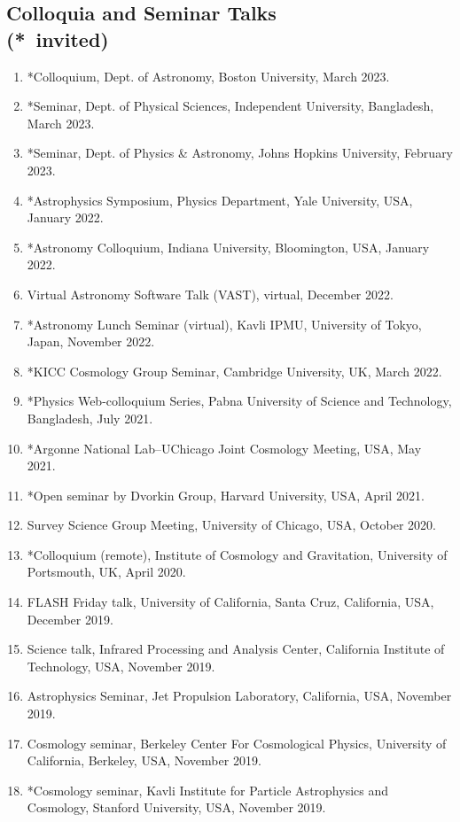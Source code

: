 \documentclass[margin, line]{res}
\begin{document}
\begin{resume}
\section{\sc Colloquia and Seminar Talks\\ ({*}\ invited)}
\begin{enumerate}
	\item *Colloquium, Dept. of Astronomy, Boston University, March 2023.
	\item *Seminar, Dept. of Physical Sciences, Independent University, Bangladesh, March 2023.
	\item {*}Seminar, Dept. of Physics \& Astronomy, Johns Hopkins University, February 2023.
	\item {*}Astrophysics Symposium, Physics Department, Yale University, USA, January 2022.
	\item {*}Astronomy Colloquium, Indiana University, Bloomington, USA, January 2022.
	\item Virtual Astronomy Software Talk (VAST), virtual, December 2022.
	\item {*}Astronomy Lunch Seminar (virtual), Kavli IPMU, University of Tokyo, Japan, November 2022.
	\item {*}KICC Cosmology Group Seminar, Cambridge University, UK, March 2022.
	\item {*}Physics Web-colloquium Series, Pabna University of Science and Technology, Bangladesh, July 2021.
	\item {*}Argonne National Lab--UChicago Joint Cosmology Meeting, USA, May 2021.
	\item {*}Open seminar by Dvorkin Group, Harvard University, USA, April 2021.
	\item Survey Science Group Meeting, University of Chicago, USA, October 2020.
	\item {*}Colloquium (remote), Institute of Cosmology and Gravitation, University of Portsmouth, UK, April 2020.
	\item FLASH Friday talk, University of California, Santa Cruz, California, USA, December 2019.
	\item Science talk, Infrared Processing and Analysis Center, California Institute of Technology, USA, November 2019.
	\item Astrophysics Seminar, Jet Propulsion Laboratory, California, USA, November 2019.
	\item Cosmology seminar, Berkeley Center For Cosmological Physics, University of California, Berkeley, USA, November 2019. 
	\item *Cosmology seminar, Kavli Institute for Particle Astrophysics and Cosmology, Stanford University, USA, November 2019.

\end{enumerate}
\end{resume}
\end{document}
